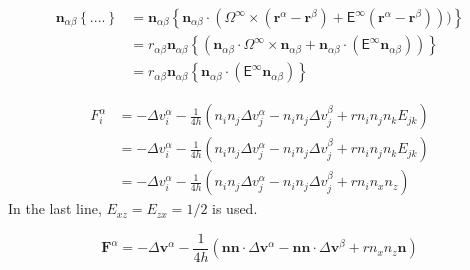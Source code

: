 \documentclass[12pt]{article}
\newcommand{\tens}[1]{\bm{\mathsf{#1}}}
\begin{document}
\begin{align*}
    \bm{n}_{\alpha\beta}    \left\{
  ....
    \right\} &= 
  \bm{n}_{\alpha\beta}
  \left\{
    \bm{n}_{\alpha\beta}  \cdot
      (
\Omega^{\infty} \times (\bm{r}^{\alpha}-\bm{r}^{\beta})
+ 
\tens{E}^{\infty}
(\bm{r}^{\alpha}-\bm{r}^{\beta}))
)
    \right\} \\
&= 
r_{\alpha\beta}
  \bm{n}_{\alpha\beta}
  \left\{
      (
\bm{n}_{\alpha\beta} \cdot \Omega^{\infty} \times \bm{n}_{\alpha\beta}
+ 
\bm{n}_{\alpha\beta} \cdot
(\tens{E}^{\infty} \bm{n}_{\alpha\beta})
)
    \right\} \\
&= 
r_{\alpha\beta}
  \bm{n}_{\alpha\beta}
  \left\{
\bm{n}_{\alpha\beta} \cdot
(\tens{E}^{\infty} \bm{n}_{\alpha\beta})
    \right\} 
\end{align*}

\begin{align*}
 F^{\alpha}_i
&=
- \Delta v^{\alpha}_i
- \frac{1}{4 h}
\left(
n_{i} n_j \Delta v^{\alpha}_j
- n_{i} n_j \Delta v^{\beta}_j
+ r n_i n_j n_k E_{jk}
\right) \\
&=
- \Delta v^{\alpha}_i
- \frac{1}{4 h}
\left(
n_{i} n_j \Delta v^{\alpha}_j
- n_{i} n_j \Delta v^{\beta}_j
+ r n_i n_j n_k E_{jk}
\right) \\
&=
- \Delta v^{\alpha}_i
- \frac{1}{4 h}
\left(
n_{i} n_j \Delta v^{\alpha}_j
- n_{i} n_j \Delta v^{\beta}_j
+  r n_i n_x n_z 
\right)
\end{align*}
In the last line,
$E_{xz}=E_{zx}=1/2$ is used.

\begin{equation}
 \bm{F}^{\alpha} = - \Delta \bm{v}^{\alpha}
- \frac{1}{4h} (\bm{n}\bm{n}\cdot\Delta \bm{v}^{\alpha}
- \bm{n}\bm{n}\cdot\Delta \bm{v}^{\beta}
 + r  n_x n_z \bm{n}
)
\end{equation}
\end{document}
